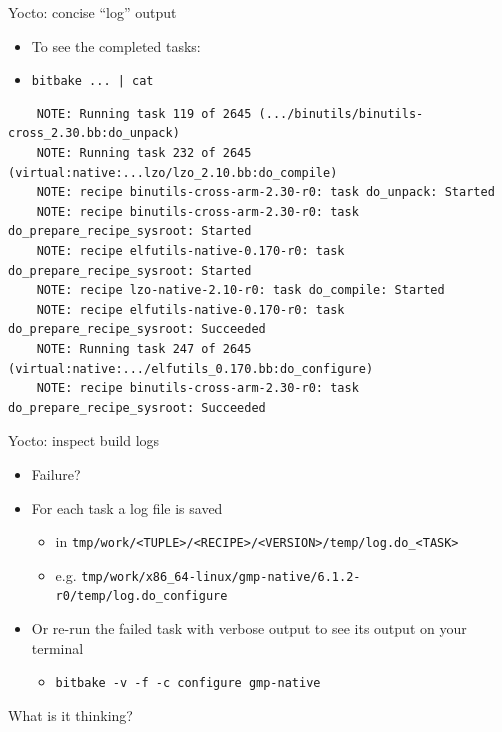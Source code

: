 \documentclass[xetex,table,aspectratio=43]{beamer}
\newcommand{\bg}[1]{
  \usebackgroundtemplate{
    \texttt{[image: images/bg-\#1.png]}
  }
}
\begin{document}
\begin{frame}[fragile]{Yocto: concise ``log'' output}
  \begin{itemize}
  \item To see the completed tasks:
  \item {\tt bitbake ... | cat}
  \end{itemize}
  \begin{verbatim}
    NOTE: Running task 119 of 2645 (.../binutils/binutils-cross_2.30.bb:do_unpack)
    NOTE: Running task 232 of 2645 (virtual:native:...lzo/lzo_2.10.bb:do_compile)
    NOTE: recipe binutils-cross-arm-2.30-r0: task do_unpack: Started
    NOTE: recipe binutils-cross-arm-2.30-r0: task do_prepare_recipe_sysroot: Started
    NOTE: recipe elfutils-native-0.170-r0: task do_prepare_recipe_sysroot: Started
    NOTE: recipe lzo-native-2.10-r0: task do_compile: Started
    NOTE: recipe elfutils-native-0.170-r0: task do_prepare_recipe_sysroot: Succeeded
    NOTE: Running task 247 of 2645 (virtual:native:.../elfutils_0.170.bb:do_configure)
    NOTE: recipe binutils-cross-arm-2.30-r0: task do_prepare_recipe_sysroot: Succeeded
  \end{verbatim}
\end{frame}

\begin{frame}{Yocto: inspect build logs}
  \begin{itemize}
  \item Failure?
  \item For each task a log file is saved
    \begin{itemize}
    \item in {\tt tmp/work/<TUPLE>/<RECIPE>/<VERSION>/temp/log.do\_<TASK>}
    \item e.g. {\scriptsize\tt tmp/work/x86\_64-linux/gmp-native/6.1.2-r0/temp/log.do\_configure}
    \end{itemize}
  \item Or re-run the failed task with verbose output to see its
    output on your terminal
    \begin{itemize}
    \item {\tt bitbake -v -f -c configure gmp-native}
    \end{itemize}
  \end{itemize}
\end{frame}

\bg{standout}
\begin{frame}[standout]
  What is it thinking?
\end{frame}
\end{document}
